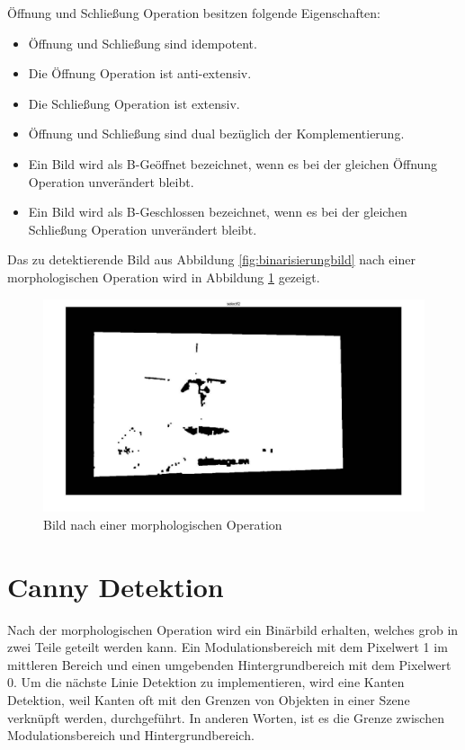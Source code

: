 Öffnung und Schließung Operation besitzen folgende Eigenschaften:

\begin{itemize}

\item Öffnung und Schließung sind idempotent.
\item Die Öffnung Operation ist anti-extensiv. 
\item Die Schließung Operation ist extensiv.
\item Öffnung und Schließung sind dual bezüglich der Komplementierung.
\item Ein Bild wird als B-Geöffnet bezeichnet, wenn es bei der gleichen Öffnung Operation unverändert bleibt. 
\item Ein Bild wird als B-Geschlossen bezeichnet, wenn es bei der gleichen Schließung Operation unverändert bleibt. 

\end{itemize}

Das zu detektierende Bild aus Abbildung \ref{fig:binarisierungbild} nach einer morphologischen Operation wird in Abbildung \ref{fig:Bild nach einer morphologischen Operation} gezeigt.

\begin{figure}[htb]
 \centering 
  \includegraphics[keepaspectratio,width=1.0\textwidth]{images/4_ZweiteErfahrung/Morphological/morpho.pdf}
 \caption{Bild nach einer morphologischen Operation}
 \label{fig:Bild nach einer morphologischen Operation}
\end{figure} 

\section{Canny Detektion}

Nach der morphologischen Operation wird ein Binärbild erhalten, welches grob in zwei Teile geteilt werden kann. Ein Modulationsbereich mit dem Pixelwert 1 im mittleren Bereich und einen umgebenden Hintergrundbereich mit dem Pixelwert 0. Um die nächste Linie Detektion zu implementieren, wird eine Kanten Detektion, weil Kanten oft mit den Grenzen von Objekten in einer Szene verknüpft werden, durchgeführt. In anderen Worten, ist es die Grenze zwischen Modulationsbereich und Hintergrundbereich. \cite{canny}

